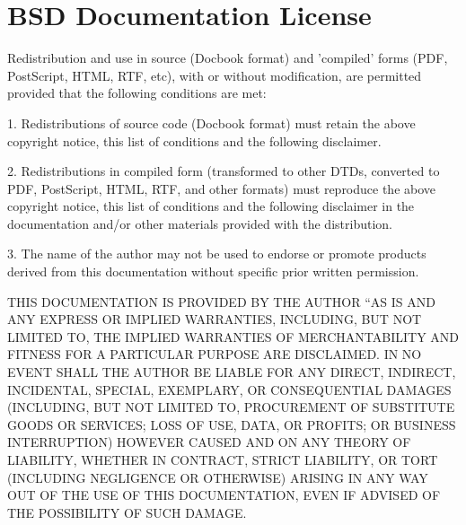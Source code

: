 \chapter*{BSD Documentation License}
\label{sec:Appendix:License}

\begingroup
\lstset{%
  breaklines=true,%
  breakindent=\parindent,
  xleftmargin=\parindent,%
  xrightmargin=\parindent,%
}
\begin{code}
Redistribution and use in source (Docbook format) and 'compiled' forms (PDF, PostScript, HTML, RTF, etc), with or without modification, are permitted provided that the following conditions are met:

1. Redistributions of source code (Docbook format) must retain the above copyright notice, this list of conditions and the following disclaimer.

2. Redistributions in compiled form (transformed to other DTDs, converted to PDF, PostScript, HTML, RTF, and other formats) must reproduce the above copyright notice, this list of conditions and the following disclaimer in the documentation and/or other materials provided with the distribution.

3. The name of the author may not be used to endorse or promote products derived from this documentation without specific prior written permission.

THIS DOCUMENTATION IS PROVIDED BY THE AUTHOR ``AS IS AND ANY EXPRESS OR IMPLIED WARRANTIES, INCLUDING, BUT NOT LIMITED TO, THE IMPLIED WARRANTIES OF MERCHANTABILITY AND FITNESS FOR A PARTICULAR PURPOSE ARE DISCLAIMED. IN NO EVENT SHALL THE AUTHOR BE LIABLE FOR ANY DIRECT, INDIRECT, INCIDENTAL, SPECIAL, EXEMPLARY, OR CONSEQUENTIAL DAMAGES (INCLUDING, BUT NOT LIMITED TO, PROCUREMENT OF SUBSTITUTE GOODS OR SERVICES; LOSS OF USE, DATA, OR PROFITS; OR BUSINESS INTERRUPTION) HOWEVER CAUSED AND ON ANY THEORY OF LIABILITY, WHETHER IN CONTRACT, STRICT LIABILITY, OR TORT (INCLUDING NEGLIGENCE OR OTHERWISE) ARISING IN ANY WAY OUT OF THE USE OF THIS DOCUMENTATION, EVEN IF ADVISED OF THE POSSIBILITY OF SUCH DAMAGE.
\end{code}
\endgroup
